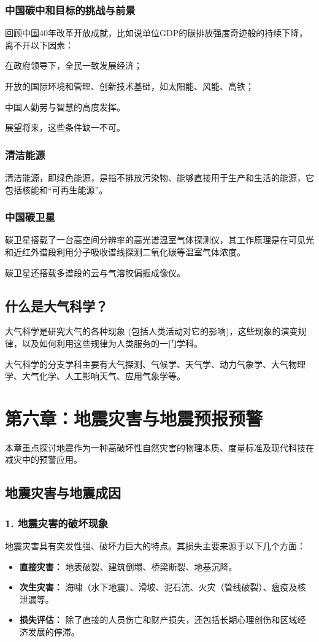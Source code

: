\documentclass[12pt,a4paper]{article}
\begin{document}
	\subsubsection{中国碳中和目标的挑战与前景}
	回顾中国40年改革开放成就，比如说单位GDP的碳排放强度奇迹般的持续下降，离不开以下因素：
	
	在政府领导下，全民一致发展经济；
	
	开放的国际环境和管理、创新技术基础，如太阳能、风能、高铁；
	
	中国人勤劳与智慧的高度发挥。
	
	展望将来，这些条件缺一不可。
	\subsubsection{清洁能源}
	清洁能源，即绿色能源，是指不排放污染物、能够直接用于生产和生活的能源，它包括核能和“可再生能源”。
	
	\subsubsection{中国碳卫星}
	
	碳卫星搭载了一台高空间分辨率的高光谱温室气体探测仪，其工作原理是在可见光和近红外谱段利用分子吸收谱线探测二氧化碳等温室气体浓度。
	
	碳卫星还搭载多谱段的云与气溶胶偏振成像仪。
	
	\subsection{什么是大气科学？}
	大气科学是研究大气的各种现象 (包括人类活动对它的影响)，这些现象的演变规律，以及如何利用这些规律为人类服务的一门学科。
	
	大气科学的分支学科主要有大气探测、气候学、天气学、动力气象学、大气物理学、大气化学、人工影响天气、应用气象学等。
	
	\section{第六章：地震灾害与地震预报预警}
	
	本章重点探讨地震作为一种高破坏性自然灾害的物理本质、度量标准及现代科技在减灾中的预警应用。
	
	\subsection{地震灾害与地震成因}
	
	\subsubsection{1. 地震灾害的破坏现象}
	地震灾害具有突发性强、破坏力巨大的特点。其损失主要来源于以下几个方面：
	\begin{itemize}
		\item \textbf{直接灾害：} 地表破裂、建筑倒塌、桥梁断裂、地基沉降。
		\item \textbf{次生灾害：} 海啸（水下地震）、滑坡、泥石流、火灾（管线破裂）、瘟疫及核泄漏等。
		\item \textbf{损失评估：} 除了直接的人员伤亡和财产损失，还包括长期心理创伤和区域经济发展的停滞。
	\end{itemize}
	
\end{document}
